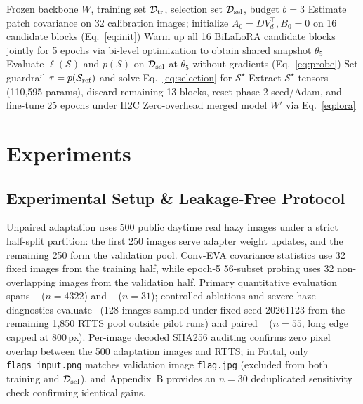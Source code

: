 \documentclass[10pt,twocolumn,letterpaper]{article}
\begin{document}
\begin{algorithm}[t]
\caption{\method: Perceptually Regulated Snapshot Masking}
\label{alg:prism}
\begin{algorithmic}[1]
\Require Frozen backbone $W$, training set $\mathcal{D}_{\rm tr}$, selection set $\mathcal{D}_{\rm sel}$, budget $b=3$
\State Estimate patch covariance on 32 calibration images; initialize $A_0=DV_d^\top, B_0=0$ on 16 candidate blocks (Eq.~\ref{eq:init})
\State Warm up all 16 BiLaLoRA candidate blocks jointly for 5 epochs via bi-level optimization to obtain shared snapshot $\theta_5$
\State Evaluate $\ell(\mathcal{S})$ and $p(\mathcal{S})$ on $\mathcal{D}_{\rm sel}$ at $\theta_5$ without gradients (Eq.~\ref{eq:probe})
\EndFor
\State Set guardrail $\tau=p(\mathcal{S}_{\rm ref})$ and solve Eq.~\eqref{eq:selection} for $\mathcal{S}^\star$
\State Extract $\mathcal{S}^\star$ tensors (110,595 params), discard remaining 13 blocks, reset phase-2 seed/Adam, and fine-tune 25 epochs under H2C
\State \Return Zero-overhead merged model $W'$ via Eq.~\eqref{eq:lora}
\end{algorithmic}
\end{algorithm}

\section{Experiments}
\subsection{Experimental Setup \& Leakage-Free Protocol}
Unpaired adaptation uses 500 public daytime real hazy images under a strict half-split partition: the first 250 images serve adapter weight updates, and the remaining 250 form the validation pool. Conv-EVA covariance statistics use 32 fixed images from the training half, while epoch-5 56-subset probing uses 32 non-overlapping images from the validation half. Primary quantitative evaluation spans \rtts~\cite{reside2019} ($n=4322$) and \fattal~\cite{fattal2014} ($n=31$); controlled ablations and severe-haze diagnostics evaluate \rttssub~(128 images sampled under fixed seed 20261123 from the remaining 1,850 RTTS pool outside pilot runs) and paired \dense~\cite{dense2019} ($n=55$, long edge capped at 800\,px). Per-image decoded SHA256 auditing confirms zero pixel overlap between the 500 adaptation images and RTTS; in Fattal, only \texttt{flags\_input.png} matches validation image \texttt{flag.jpg} (excluded from both training and $\mathcal{D}_{\rm sel}$), and Appendix~B provides an $n=30$ deduplicated sensitivity check confirming identical gains.
\end{document}
